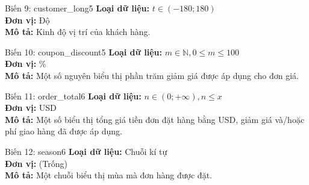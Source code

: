 \noindent
\begin{minipage}[t]{0.48\textwidth}
\begin{mainbox}{Biến 9: customer\_long}{5}
    \textbf{Loại dữ liệu:} \(t \in (-180; 180)\) \\
    \textbf{Đơn vị:} Độ \\
    \textbf{Mô tả:} Kinh độ vị trí của khách hàng.
\end{mainbox}
\end{minipage}
\hfill
\begin{minipage}[t]{0.48\textwidth}
\begin{mainbox}{Biến 10: coupon\_discount}{5}
    \textbf{Loại dữ liệu:} \(m \in \mathbb{N}, 0 \leq m \leq 100\) \\
    \textbf{Đơn vị:} \% \\
    \textbf{Mô tả:} Một số nguyên biểu thị phần trăm giảm giá được áp dụng cho đơn giá.
\end{mainbox}
\end{minipage}

\vspace{0.5cm}

\noindent
\begin{minipage}[t]{0.48\textwidth}
\begin{mainbox}{Biến 11: order\_total}{6}
    \textbf{Loại dữ liệu:} \(n \in (0; +\infty), n \leq x\) \\
    \textbf{Đơn vị:} USD \\
    \textbf{Mô tả:} Một số biểu thị tổng giá tiền đơn đặt hàng bằng USD, giảm giá và/hoặc phí giao hàng đã được áp dụng.
\end{mainbox}
\end{minipage}
\hfill
\begin{minipage}[t]{0.48\textwidth}
\begin{mainbox}{Biến 12: season}{6}
    \textbf{Loại dữ liệu:} Chuỗi kí tự \\
    \textbf{Đơn vị:} (Trống) \\
    \textbf{Mô tả:} Một chuỗi biểu thị mùa mà đơn hàng được đặt.
\end{mainbox}
\end{minipage}

\vspace{0.5cm}

